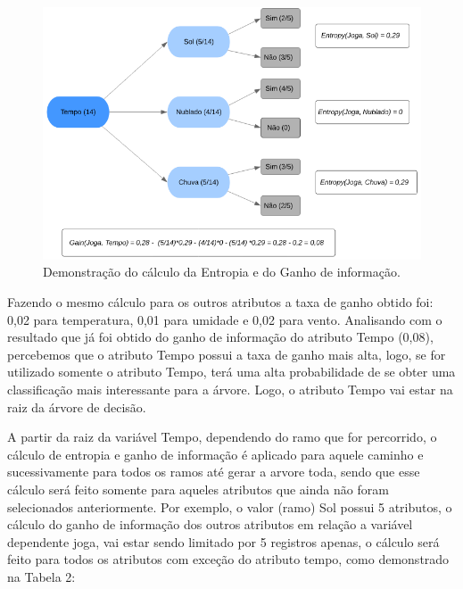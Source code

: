 \begin{figure}[!htp]
	\begin{center}
    \caption{\label{fig:waveform_fig} Demonstração do cálculo da Entropia e do Ganho de informação.}
	\includegraphics[scale=0.80]{Figuras/Calculo_ganho_de_informacao.png}
	\end{center}
\end{figure}

\par
Fazendo o mesmo cálculo para os outros atributos a taxa de ganho obtido foi: 0,02 para temperatura, 0,01 para umidade e 0,02 para vento. Analisando com o resultado que já foi obtido do ganho de informação do atributo Tempo (0,08), percebemos que o atributo Tempo possui a taxa de ganho mais alta, logo, se for utilizado somente o atributo Tempo, terá uma alta probabilidade de se obter uma classificação mais interessante para a árvore. Logo, o atributo Tempo vai estar na raiz da árvore de decisão.

\par
A partir da raiz da variável Tempo, dependendo do ramo que for percorrido, o cálculo de entropia e ganho de informação é aplicado para aquele caminho e sucessivamente para todos os ramos até gerar a arvore toda, sendo que esse cálculo será feito somente para aqueles atributos que ainda não foram selecionados anteriormente. Por exemplo, o valor (ramo) Sol possui 5 atributos, o cálculo do ganho de informação dos outros atributos em relação a variável dependente joga, vai estar sendo limitado por 5 registros apenas, o cálculo será feito para todos os atributos com exceção do atributo tempo, como demonstrado na Tabela 2:

